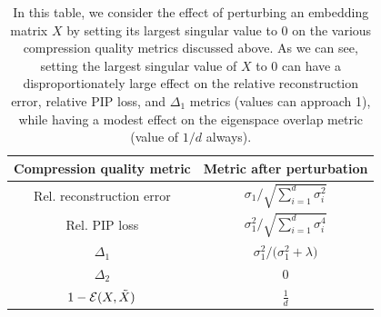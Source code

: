 \begin{table}
	\caption{In this table, we consider the effect of perturbing an embedding matrix $X$ by setting its largest singular value to 0 on the various compression quality metrics discussed above.
	As we can see, setting the largest singular value of $X$ to 0 can have a disproportionately large effect on the relative reconstruction error, relative PIP loss, and $\Delta_1$ metrics (values can approach 1), while having a modest effect on the eigenspace overlap metric (value of $1/d$ always).
}
	\centering
	\begin{tabular}{ c | c }
		Compression quality metric & Metric after perturbation \\ \midrule
		Rel. reconstruction error &  $\sigma_1/\sqrt{\sum_{i=1}^d \sigma_i^2}$ \\
		Rel. PIP loss & $\sigma_1^2 / \sqrt{\sum_{i=1}^d \sigma_i^4}$ \\
		$\Delta_1$ & $\sigma_1^2 / \Big(\sigma_1^2 + \lambda\Big)$ \\
		$\Delta_2$ & 0 \\
		$1-\eigover(X,\tX)$ & $\frac{1}{d}$\\ %
	\end{tabular}
	\label{table:perturb}
\end{table}

